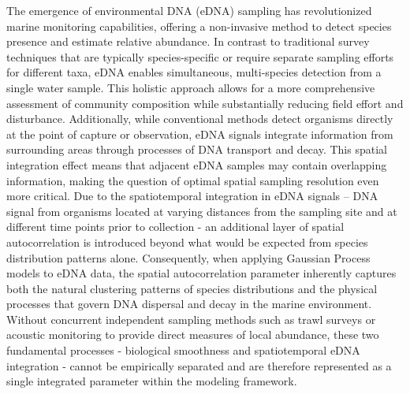 \documentclass{article}
\begin{document}
The emergence of environmental DNA (eDNA) sampling has revolutionized marine monitoring capabilities, offering a non-invasive method to detect species presence and estimate relative abundance. In contrast to traditional survey techniques that are typically species-specific or require separate sampling efforts for different taxa, eDNA enables simultaneous, multi-species detection from a single water sample. This holistic approach allows for a more comprehensive assessment of community composition while substantially reducing field effort and disturbance. Additionally, while conventional methods detect organisms directly at the point of capture or observation, eDNA signals integrate information from surrounding areas through processes of DNA transport and decay. This spatial integration effect means that adjacent eDNA samples may contain overlapping information, making the question of optimal spatial sampling resolution even more critical. Due to the spatiotemporal integration in eDNA signals -- DNA signal from organisms located at varying distances from the sampling site and at different time points prior to collection - an additional layer of spatial autocorrelation is introduced beyond what would be expected from species distribution patterns alone. Consequently, when applying Gaussian Process models to eDNA data, the spatial autocorrelation parameter inherently captures both the natural clustering patterns of species distributions and the physical processes that govern DNA dispersal and decay in the marine environment. Without concurrent independent sampling methods such as trawl surveys or acoustic monitoring to provide direct measures of local abundance, these two fundamental processes - biological smoothness and spatiotemporal eDNA integration - cannot be empirically separated and are therefore represented as a single integrated parameter within the modeling framework.
\end{document}

